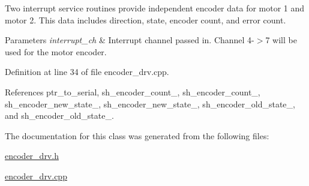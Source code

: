 Two interrupt service routines provide independent encoder data for motor 1 and motor 2. This data includes direction, state, encoder count, and error count. 
\begin{DoxyParams}{Parameters}
{\em interrupt\-\_\-ch} & Interrupt channel passed in. Channel 4-\/$>$7 will be used for the motor encoder. \\
\hline
\end{DoxyParams}


Definition at line 34 of file encoder\-\_\-drv.\-cpp.



References ptr\-\_\-to\-\_\-serial, sh\-\_\-encoder\-\_\-count\-\_, sh\-\_\-encoder\-\_\-count\-\_, sh\-\_\-encoder\-\_\-new\-\_\-state\-\_, sh\-\_\-encoder\-\_\-new\-\_\-state\-\_, sh\-\_\-encoder\-\_\-old\-\_\-state\-\_, and sh\-\_\-encoder\-\_\-old\-\_\-state\-\_.



The documentation for this class was generated from the following files\-:\begin{DoxyCompactItemize}
\item 
\hyperlink{encoder__drv_8h}{encoder\-\_\-drv.\-h}\item 
\hyperlink{encoder__drv_8cpp}{encoder\-\_\-drv.\-cpp}\end{DoxyCompactItemize}
